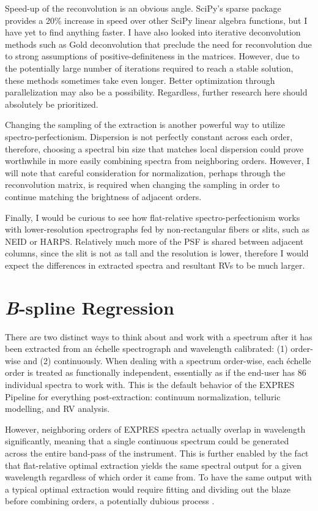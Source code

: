 Speed-up of the reconvolution is an obvious angle. SciPy's sparse package provides a 20\% increase in speed over other SciPy linear algebra functions, but I have yet to find anything faster. I have also looked into iterative deconvolution methods such as Gold deconvolution \citep{morhac_efficient_2003, morhac_deconvolution_2006} that preclude the need for reconvolution due to strong assumptions of positive-definiteness in the matrices. However, due to the potentially large number of iterations required to reach a stable solution, these methods sometimes take even longer. Better optimization through parallelization may also be a possibility. Regardless, further research here should absolutely be prioritized.

Changing the sampling of the extraction is another powerful way to utilize spectro-perfectionism. Dispersion is not perfectly constant across each order, therefore, choosing a spectral bin size that matches local dispersion could prove worthwhile in more easily combining spectra from neighboring orders. However, I will note that careful consideration for normalization, perhaps through the reconvolution matrix, is required when changing the sampling in order to continue matching the brightness of adjacent orders.

Finally, I would be curious to see how flat-relative spectro-perfectionism works with lower-resolution spectrographs fed by non-rectangular fibers or slits, such as NEID or HARPS. Relatively much more of the PSF is shared between adjacent columns, since the slit is not as tall and the resolution is lower, therefore I would expect the differences in extracted spectra and resultant RVs to be much larger.

\section{\textit{B}-spline Regression} \label{pipeline2:bspline}

There are two distinct ways to think about and work with a spectrum after it has been extracted from an \'echelle spectrograph and wavelength calibrated: (1) order-wise and (2) continuously. When dealing with a spectrum order-wise, each \'echelle order is treated as functionally independent, essentially as if the end-user has 86 individual spectra to work with. This is the default behavior of the EXPRES Pipeline for everything post-extraction: continuum normalization, telluric modelling, and RV analysis.

However, neighboring orders of EXPRES spectra actually overlap in wavelength significantly, meaning that a single continuous spectrum could be generated across the entire band-pass of the instrument. This is further enabled by the fact that flat-relative optimal extraction yields the same spectral output for a given wavelength regardless of which order it came from. To have the same output with a typical optimal extraction would require fitting and dividing out the blaze before combining orders, a potentially dubious process \citep[e.g.][]{xu_modeling_2019}.

